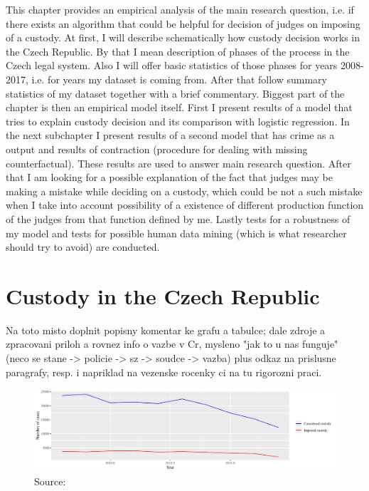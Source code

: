 \documentclass[12pt, twoside]{book} %
\begin{document}
This chapter provides an empirical analysis of the main research question, i.e. if there exists an algorithm that could be helpful for decision of judges on imposing of a custody. At first, I will describe schematically how custody decision works in the Czech Republic. By that I mean description of phases of the process in the Czech legal system. Also I will offer basic statistics of those phases for years 2008-2017, i.e. for years my dataset is coming from. After that follow summary statistics of my dataset together with a brief commentary.\newline
Biggest part of the chapter is then an empirical model itself. First I present results of a model that tries to explain custody decision and its comparison with logistic regression. In the next subchapter I present results of a second model that has crime as a output and results of contraction (procedure for dealing with missing counterfactual). These results are used to answer main research question. After that I am looking for a possible explanation of the fact that judges may be making a mistake while deciding on a custody, which could be not a such mistake when I take into account possibility of a existence of different production function of the judges from that function defined by me. Lastly tests for a robustness of my model and tests for possible human data mining (which is what researcher should try to avoid) are conducted. 


\section{Custody in the Czech Republic}      %

Na toto misto doplnit popisny komentar ke grafu a tabulce; dale zdroje a zpracovani priloh a rovnez info o 
vazbe v Cr, mysleno "jak to u nas funguje" (neco se stane -> policie -> sz -> soudce -> vazba) plus odkaz na prislusne paragrafy, resp. i napriklad na vezenske rocenky ci na tu rigorozni praci. 


\begin{figure}[H]
\includegraphics[width=\textwidth]{plot_21_1.pdf}
{\small Source: }
\end{figure}
\end{document}

